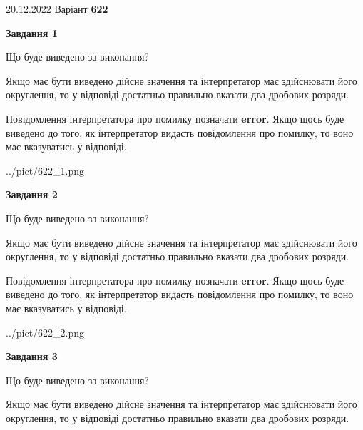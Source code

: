 \documentclass[12pt, ukrainian]{article}
\begin{document}
{20.12.2022 Варіант \No \textbf { 622 }\par}
{
\begin {Large}

{\begin {center}\textbf{Завдання 1}\end {center}}\par
Що буде виведено за виконання? \par

Якщо має бути виведено дійсне значення та інтерпретатор має здійснювати його округлення, 
то у відповіді достатньо правильно вказати два дробових розряди.

Повідомлення інтерпретатора про помилку позначати \textbf{error}.
Якщо щось буде виведено до того, як інтерпретатор видасть повідомлення про помилку, 
то воно має вказуватись у відповіді. \par

\begin{center}
	{../pict/622_1.png}
\end{center}
\newpage

{\begin {center}\textbf{Завдання 2}\end {center}}\par
Що буде виведено за виконання? \par

Якщо має бути виведено дійсне значення та інтерпретатор має здійснювати його округлення, 
то у відповіді достатньо правильно вказати два дробових розряди.

Повідомлення інтерпретатора про помилку позначати \textbf{error}.
Якщо щось буде виведено до того, як інтерпретатор видасть повідомлення про помилку, 
то воно має вказуватись у відповіді. \par

\begin{center}
	{../pict/622_2.png}
\end{center}
\newpage

{\begin {center}\textbf{Завдання 3}\end {center}}\par
Що буде виведено за виконання? \par

Якщо має бути виведено дійсне значення та інтерпретатор має здійснювати його округлення, 
то у відповіді достатньо правильно вказати два дробових розряди.


\end{Large}}
\end{document}
